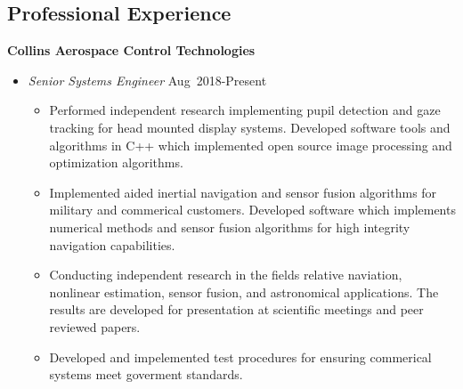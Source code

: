\subsection*{Professional Experience}
{}

\textbf{Collins Aerospace Control Technologies}

\begin{itemize}
    \item[] \textit{Senior Systems Engineer} \hfill {Aug~2018-Present} 
        \begin{itemize}
            \item Performed independent research implementing pupil detection and gaze tracking for head mounted display systems. 
                Developed software tools and algorithms in C++ which implemented open source image processing and optimization algorithms.
            \item Implemented aided inertial navigation and sensor fusion algorithms for military and commerical customers. 
                Developed software which implements numerical methods and sensor fusion algorithms for high integrity navigation capabilities.
            \item Conducting independent research in the fields relative naviation, nonlinear estimation, sensor fusion, and astronomical applications.
                The results are developed for presentation at scientific meetings and peer reviewed papers.
            \item Developed and impelemented test procedures for ensuring commerical systems meet goverment standards.
        \end{itemize}
\end{itemize}

